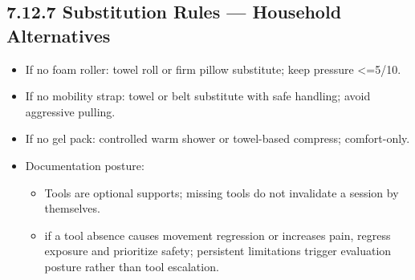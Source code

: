 \documentclass[10pt]{article}
\begin{document}
\subsection*{7.12.7 Substitution Rules — Household Alternatives}
{}

\begin{itemize}
\item If no foam roller: towel roll or firm pillow substitute; keep pressure <=5/10.
\item If no mobility strap: towel or belt substitute with safe handling; avoid aggressive pulling.
\item If no gel pack: controlled warm shower or towel-based compress; comfort-only.
\item Documentation posture:
  \begin{itemize}
  \item Tools are optional supports; missing tools do not invalidate a session by themselves.
  \item if a tool absence causes movement regression or increases pain, regress exposure and prioritize safety; persistent limitations trigger evaluation posture rather than tool escalation.
  \end{itemize}
\end{itemize}
\end{document}
